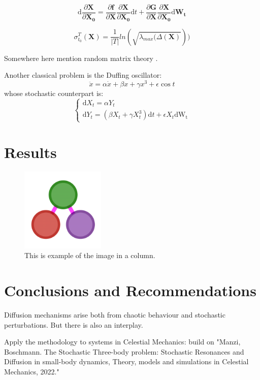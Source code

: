 \documentclass{juliacon}
\newcommand{\drv}{\textrm{d}}
\begin{document}
\begin{equation}
\drv \frac{\partial \mathbf{X}}{\partial \mathbf{X_0}}=
\frac{\partial \mathbf{f}}{\partial \mathbf{X}}
\frac{\partial \mathbf{X}}{\partial \mathbf{X_0}} \drv t
+
\frac{\partial \mathbf{G}}{\partial \mathbf{X}}
\frac{\partial \mathbf{X}}{\partial \mathbf{X_0}} \drv \mathbf{W_t}
\end{equation}

\begin{equation}
    \sigma_{t_0}^T(\mathbf{X})=\frac{1}{|T|}ln(\sqrt{\lambda_{max}(\Delta(\mathbf{X})}))
\end{equation}

Somewhere here mention random matrix theory \cite{potters_bouchaud_2020}.

Another classical problem is the Duffing oscillator:
\begin{equation}
\ddot{x}=\alpha \dot{x}+\beta x+\gamma x^3 + \epsilon\cos{t}
\end{equation}
whose stochastic counterpart is: 
\begin{equation}
    \begin{cases}
    \drv X_t= \alpha Y_t \\
    \drv Y_t = (\beta X_t + \gamma X_t^3)\drv t +\epsilon X_t \drv \mathrm{W_t} 
\end{cases}
\end{equation}


\section{Results}

\begin{figure}[h]
    \centerline{\includegraphics[width=4cm]{juliagraphs.png}}
    \caption{This is example of the image in a column.}
        \label{fig:sample_figure}
    \end{figure}

\section{Conclusions and Recommendations}
Diffusion mechanisms arise both from chaotic behaviour and stochastic perturbations. But there is also an interplay.

Apply the methodology to systems in Celestial Mechanics: build on "Manzi, Boschmann. The Stochastic Three-body problem: Stochastic Resonances and Diffusion in small-body dynamics, Theory, models and simulations in Celestial Mechanics, 2022."


\end{document}
